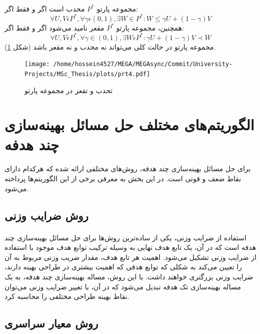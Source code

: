 \documentclass[a4paper,titlepage,12pt,fleqn,oneside]{report}
\begin{document}
	\paragraph{}
	مجموعه پارتو $P^{*}$ محدب است اگر و فقط اگر:
	\begin{equation}
		\forall U, V \epsilon P^{*}, \forall \gamma \epsilon(0,1), \exists W \in P^{*}: W \leq \gamma U+(1-\gamma) V
	\end{equation}
	همچنین، مجموعه پارتو $P^{*}$ مقعر نامید می‌شود اگر و فقط اگر: 
	\begin{equation}
		\forall U, V \epsilon P^{*}, \forall \gamma \in(0,1), \exists W \epsilon P^{*}: \gamma U+(1-\gamma) V \prec W
	\end{equation}
	مجموعه پارتو در حالت کلی می‌تواند نه محدب و نه مقعر باشد (شکل \ref{fig:prt4}).
	\begin{figure}[ht]
		\centering
		\texttt{[image: /home/hossein4527/MEGA/MEGAsync/Commit/University-Projects/MSc\_Thesis/plots/prt4.pdf]}
		\caption{تحدب و تقعر در مجموعه پارتو}
		\label{fig:prt4}
	\end{figure}
	\section{الگوریتم‌های مختلف حل مسائل بهینه‌سازی چند هدفه}
	\paragraph{}
	برای حل مسائل بهینه‌سازی چند هدفه، روش‌های مختلفی ارائه شده که هرکدام دارای نقاط ضعف و قوتی است. در این بخش به معرفی برخی از این الگوریتم‌ها پرداخته می‌شود.
	\subsection{روش ضرایب وزنی}
	\paragraph{}
	استفاده از ضرایب وزنی، یکی از ساده‌ترین روش‌ها برای حل مسائل بهینه‌سازی چند هدفه است که در آن، یک تابع هدف نهایی به وسیله ترکیب توابع هدف موجود با استفاده از ضرایب وزنی تشکیل می‌شود. اهمیت هر تابع هدف، مقدار ضریب وزنی مربوط به آن را تعیین می‌کند به شکلی که توابع هدفی که اهمیت بیشتری در طراحی بهینه دارند، ضرایب وزنی بزرگتری خواهند داشت. با این روش، مساله بهینه‌سازی چند هدفه، به یک مساله بهینه‌سازی تک هدفه تبدیل می‌شود که در آن، با تغییر ضرایب وزنی می‌توان نقاط بهینه طراحی مختلفی را محاسبه کرد.
	\subsection{روش معیار سراسری}
\end{document}
